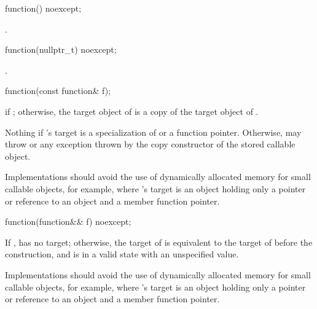 %
\begin{itemdecl}
function() noexcept;
\end{itemdecl}

\begin{itemdescr}
\pnum
\ensures
{}.
\end{itemdescr}

%
\begin{itemdecl}
function(nullptr_t) noexcept;
\end{itemdecl}

\begin{itemdescr}
\pnum
\ensures
{}.
\end{itemdescr}

%
\begin{itemdecl}
function(const function& f);
\end{itemdecl}

\begin{itemdescr}
\pnum
\ensures
{} if ; otherwise,
the target object of  is a copy of the target object of .

\pnum
\throws
Nothing if 's target is
a specialization of  or
a function pointer. Otherwise, may throw 
or any exception thrown by the copy constructor of the stored callable object.

\pnum
\recommended
Implementations should avoid the use of
dynamically allocated memory for small callable objects, for example, where
's target is an object holding only a pointer or reference
to an object and a member function pointer.
\end{itemdescr}

%
\begin{itemdecl}
function(function&& f) noexcept;
\end{itemdecl}

\begin{itemdescr}
\pnum
\ensures
If ,  has no target;
otherwise, the target of  is equivalent to
the target of  before the construction, and
 is in a valid state with an unspecified value.

\pnum
\recommended
Implementations should avoid the use of
dynamically allocated memory for small callable objects, for example,
where 's target is an object holding only a pointer or reference
to an object and a member function pointer.
\end{itemdescr}

